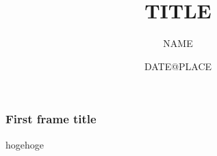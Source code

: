 \documentclass[uplatex,dvipdfmx,cjk,t,compress,notheorems]{beamer}
\title[short title]{%
\Large
TITLE
}
\author[Short name]{\normalsize NAME}
\institute[Short Inst.]{INSTTITUTE}
\date{DATE@PLACE}
\theoremstyle{definition}
\begin{document}
\begin{frame}[plain]
 \titlepage
\end{frame}


\begin{frame}
 \frametitle{First frame title}
 hogehoge
\end{frame}
\end{document}
